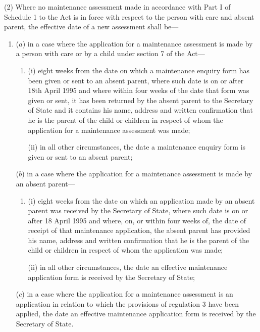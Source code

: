 \documentclass[a4paper,12pt]{article}
\begin{document}
(2) Where no maintenance assessment made in accordance with Part I of Schedule 1 to the Act is in force with respect to the person with care and absent parent, the effective date of a new assessment shall be—
\begin{enumerate}\item[]
($a$) in a case where the application for a maintenance assessment is made by a person with care or by a child under section 7 of the Act—
\begin{enumerate}\item[]
(i) eight weeks from the date on which a maintenance enquiry form has been given or sent to an absent parent, where such date is on or after 18th April 1995 and where within four weeks of the date that form was given or sent, it has been returned by the absent parent to the Secretary of State and it contains his name, address and written confirmation that he is the parent of the child or children in respect of whom the application for a maintenance assessment was made;

(ii) in all other circumstances, the date a maintenance enquiry form is given or sent to an absent parent;
\end{enumerate}

($b$) in a case where the application for a maintenance assessment is made by an absent parent—
\begin{enumerate}\item[]
(i) eight weeks from the date on which an application made by an absent parent was received by the Secretary of State, where such date is on or after 18 April 1995 and where, on, or within four weeks of, the date of receipt of that maintenance application, the absent parent has provided his name, address and written confirmation that he is the parent of the child or children in respect of whom the application was made;

(ii) in all other circumstances, the date an effective maintenance application form is received by the Secretary of State;
\end{enumerate}

($c$) in a case where the application for a maintenance assessment is an application in relation to which the provisions of regulation 3 have been applied, the date an effective maintenance application form is received by the Secretary of State.
\end{enumerate}
\end{document}
